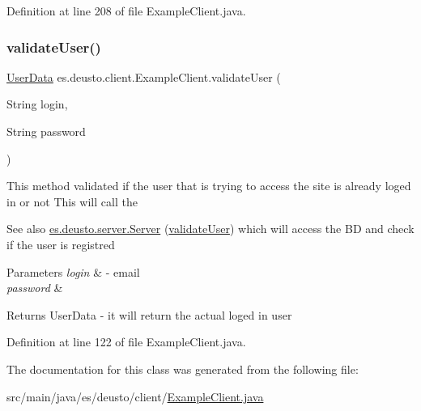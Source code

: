 Definition at line 208 of file Example\+Client.\+java.

\mbox{\label{classes_1_1deusto_1_1client_1_1_example_client_a740fa7000d0cd30603ce100b299ba8ba}} 
\subsubsection{\texorpdfstring{validate\+User()}{validateUser()}}
{\footnotesize\ttfamily \hyperlink{classes_1_1deusto_1_1serialization_1_1_user_data}{User\+Data} es.\+deusto.\+client.\+Example\+Client.\+validate\+User (\begin{DoxyParamCaption}\item[{String}]{login,  }\item[{String}]{password }\end{DoxyParamCaption})}

This method validated if the user that is trying to access the site is already loged in or not This will call the \begin{DoxySeeAlso}{See also}
\hyperlink{classes_1_1deusto_1_1server_1_1_server}{es.\+deusto.\+server.\+Server} (\hyperlink{classes_1_1deusto_1_1client_1_1_example_client_a740fa7000d0cd30603ce100b299ba8ba}{validate\+User}) which will access the BD and check if the user is registred 
\end{DoxySeeAlso}

\begin{DoxyParams}{Parameters}
{\em login} & -\/ email \\
\hline
{\em password} & \\
\hline
\end{DoxyParams}
\begin{DoxyReturn}{Returns}
User\+Data -\/ it will return the actual loged in user 
\end{DoxyReturn}


Definition at line 122 of file Example\+Client.\+java.



The documentation for this class was generated from the following file\+:\begin{DoxyCompactItemize}
\item 
src/main/java/es/deusto/client/\hyperlink{_example_client_8java}{Example\+Client.\+java}\end{DoxyCompactItemize}
